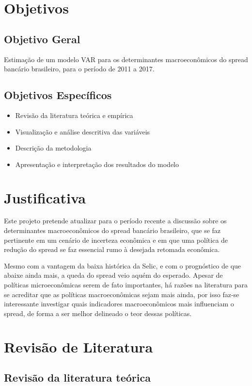 \documentclass[a4paper, article, 12pt, openany, oneside, english, brazil]{abntex2}
\begin{document}
\section{Objetivos}
\subsection{Objetivo Geral}

    Estimação de um modelo VAR para os determinantes macroeconômicos do spread bancário brasileiro, para o período de 2011 a 2017.

\subsection{Objetivos Específicos}

\begin{itemize}
    \item Revisão da literatura teórica e empírica
    \item Visualização e análise descritiva das variáveis
    \item Descrição da metodologia
    \item Apresentação e interpretação dos resultados do modelo
\end{itemize}


\section{Justificativa}

   Este projeto pretende atualizar para o período recente a discussão sobre os determinantes macroeconômicos do spread bancário brasileiro, que se faz pertinente em um cenário de incerteza econômica e em que uma política de redução do spread se faz essencial rumo à desejada retomada econômica.

   Mesmo com a vantagem da baixa histórica da Selic, e com o prognóstico de que abaixe ainda mais, a queda do spread veio aquém do esperado. Apesar de políticas microeconômicas serem de fato importantes, há razões na literatura para se acreditar que as políticas macroeconômicas sejam mais ainda, por isso faz-se interessante investigar quais indicadores macroeconômicos mais influenciam o spread, de forma a ser melhor delineado o teor dessas políticas.

\section{Revisão de Literatura}
\subsection{Revisão da literatura teórica}
\end{document}
